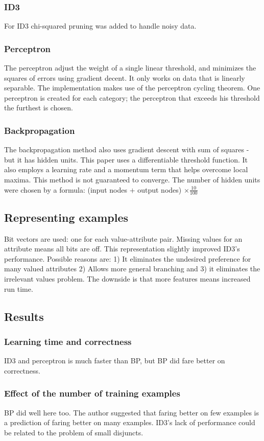 \subsubsection{ID3} 
For ID3 chi-squared pruning \cite{quinlan:noise} was added to handle noisy data.
\subsubsection{Perceptron}
The perceptron \cite{rosenblatt:perceptrons} adjust the weight of a single linear threshold, and minimizes the squares of errors using gradient decent.  It only works on data that is linearly separable.  The implementation makes use of the perceptron cycling theorem.  One perceptron is created for each category; the perceptron that exceeds his threshold the furthest is chosen.
\subsubsection{Backpropagation} 
The backpropagation \cite{rumelhart:propagation} method also uses gradient descent with sum of squares - but it has hidden units.  This paper uses a differentiable threshold function.  It also employs a learning rate and a momentum term that helps overcome local maxima. This method is not guaranteed to converge.  The number of hidden units were chosen by a formula: (input nodes $+$ output nodes) $\times \frac{10}{100}$
\subsection{Representing examples}
Bit vectors are used: one for each value-attribute pair. Missing values for an attribute means all bits are off.
This representation slightly improved ID3's performance. Possible reasons are: 1) It eliminates the undesired preference for many valued attributes 2) Allows more general branching  and 3) it eliminates the irrelevant values problem.  The downside is that more features means increased run time.
\subsection{Results}
\subsubsection{Learning time and correctness} 
ID3 and perceptron is much faster than BP, but BP did fare better on correctness.
\subsubsection{Effect of the number of training examples}
BP did well here too.  The author suggested that faring better on few examples is a prediction of faring better on many examples.  ID3's lack of performance could be related to the problem of small disjuncts.
